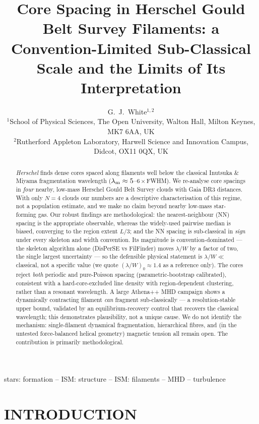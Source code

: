 \documentclass[usenatbib,twoside,twocolumn]{mnras}
\title[Sub-classical core spacing in HGBS filaments]{Core Spacing in Herschel Gould Belt Survey Filaments: a Convention-Limited Sub-Classical Scale and the Limits of Its Interpretation}
\author[G.~J.~White]{G.~J.~White$^{1,2}$\\
$^{1}$School of Physical Sciences, The Open University, Walton Hall, Milton Keynes, MK7 6AA, UK\\
$^{2}$Rutherford Appleton Laboratory, Harwell Science and Innovation Campus, Didcot, OX11 0QX, UK}
\begin{document}
\maketitle

\begin{abstract}
\textit{Herschel} finds dense cores spaced along filaments well below the classical Inutsuka \& Miyama fragmentation wavelength ($\lambda_{\rm m}\approx5$--$6\times$FWHM). We re-analyse core spacings in \emph{four} nearby, low-mass Herschel Gould Belt Survey clouds with Gaia DR3 distances. With only $N=4$ clouds our numbers are a descriptive characterisation of this regime, not a population estimate, and we make no claim beyond nearby low-mass star-forming gas. Our robust findings are methodological: the nearest-neighbour (NN) spacing is the appropriate observable, whereas the widely-used pairwise median is biased, converging to the region extent $L/3$; and the NN spacing is sub-classical in \emph{sign} under every skeleton and width convention. Its magnitude is convention-dominated --- the skeleton algorithm alone (DisPerSE vs FilFinder) moves $\lambda/W$ by a factor of two, the single largest uncertainty --- so the defensible physical statement is $\lambda/W\ll$ classical, not a specific value (we quote $(\lambda/W)_0\approx1.4$ as a reference only). The cores reject \emph{both} periodic and pure-Poisson spacing (parametric-bootstrap calibrated), consistent with a hard-core-excluded line density with region-dependent clustering, rather than a resonant wavelength. A large Athena++ MHD campaign shows a dynamically contracting filament \emph{can} fragment sub-classically --- a resolution-stable upper bound, validated by an equilibrium-recovery control that recovers the classical wavelength; this demonstrates plausibility, not a unique cause. We do not identify the mechanism: single-filament dynamical fragmentation, hierarchical fibres, and (in the untested force-balanced helical geometry) magnetic tension all remain open. The contribution is primarily methodological.
\end{abstract}


\begin{keywords}
stars: formation -- ISM: structure -- ISM: filaments -- MHD -- turbulence
\end{keywords}

\section{INTRODUCTION}
\end{document}
